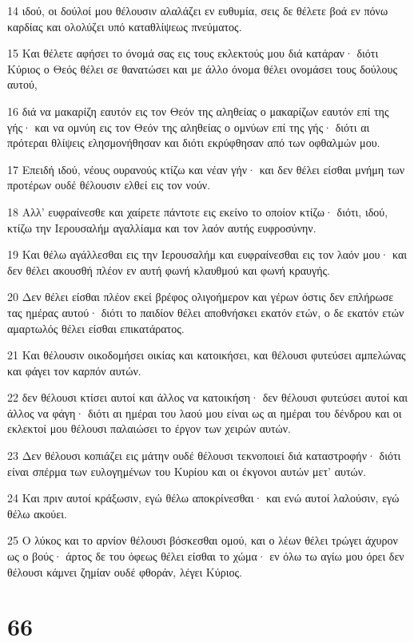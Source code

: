 \par 14 ιδού, οι δούλοί μου θέλουσιν αλαλάζει εν ευθυμία, σεις δε θέλετε βοά εν πόνω καρδίας και ολολύζει υπό καταθλίψεως πνεύματος.
\par 15 Και θέλετε αφήσει το όνομά σας εις τους εκλεκτούς μου διά κατάραν· διότι Κύριος ο Θεός θέλει σε θανατώσει και με άλλο όνομα θέλει ονομάσει τους δούλους αυτού,
\par 16 διά να μακαρίζη εαυτόν εις τον Θεόν της αληθείας ο μακαρίζων εαυτόν επί της γής· και να ομνύη εις τον Θεόν της αληθείας ο ομνύων επί της γής· διότι αι πρότεραι θλίψεις ελησμονήθησαν και διότι εκρύφθησαν από των οφθαλμών μου.
\par 17 Επειδή ιδού, νέους ουρανούς κτίζω και νέαν γήν· και δεν θέλει είσθαι μνήμη των προτέρων ουδέ θέλουσιν ελθεί εις τον νούν.
\par 18 Αλλ' ευφραίνεσθε και χαίρετε πάντοτε εις εκείνο το οποίον κτίζω· διότι, ιδού, κτίζω την Ιερουσαλήμ αγαλλίαμα και τον λαόν αυτής ευφροσύνην.
\par 19 Και θέλω αγάλλεσθαι εις την Ιερουσαλήμ και ευφραίνεσθαι εις τον λαόν μου· και δεν θέλει ακουσθή πλέον εν αυτή φωνή κλαυθμού και φωνή κραυγής.
\par 20 Δεν θέλει είσθαι πλέον εκεί βρέφος ολιγοήμερον και γέρων όστις δεν επλήρωσε τας ημέρας αυτού· διότι το παιδίον θέλει αποθνήσκει εκατόν ετών, ο δε εκατόν ετών αμαρτωλός θέλει είσθαι επικατάρατος.
\par 21 Και θέλουσιν οικοδομήσει οικίας και κατοικήσει, και θέλουσι φυτεύσει αμπελώνας και φάγει τον καρπόν αυτών.
\par 22 δεν θέλουσι κτίσει αυτοί και άλλος να κατοικήση· δεν θέλουσι φυτεύσει αυτοί και άλλος να φάγη· διότι αι ημέραι του λαού μου είναι ως αι ημέραι του δένδρου και οι εκλεκτοί μου θέλουσι παλαιώσει το έργον των χειρών αυτών.
\par 23 Δεν θέλουσι κοπιάζει εις μάτην ουδέ θέλουσι τεκνοποιεί διά καταστροφήν· διότι είναι σπέρμα των ευλογημένων του Κυρίου και οι έκγονοι αυτών μετ' αυτών.
\par 24 Και πριν αυτοί κράξωσιν, εγώ θέλω αποκρίνεσθαι· και ενώ αυτοί λαλούσιν, εγώ θέλω ακούει.
\par 25 Ο λύκος και το αρνίον θέλουσι βόσκεσθαι ομού, και ο λέων θέλει τρώγει άχυρον ως ο βούς· άρτος δε του όφεως θέλει είσθαι το χώμα· εν όλω τω αγίω μου όρει δεν θέλουσι κάμνει ζημίαν ουδέ φθοράν, λέγει Κύριος.

\chapter{66}

